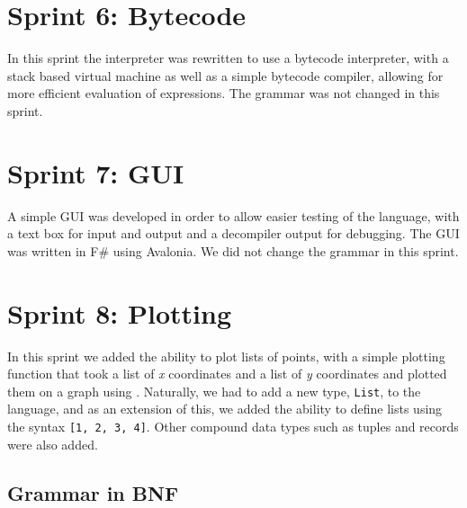 \section{Sprint 6: Bytecode}\label{sec:bytecode}

In this sprint the interpreter was rewritten to use a bytecode interpreter, with a stack based virtual machine as 
well as a simple bytecode compiler, allowing for more efficient evaluation of expressions.
The grammar was not changed in this sprint.

\section{Sprint 7: GUI}\label{sec:gui}

A simple GUI was developed in order to allow easier testing of the language, with a text box for input and output and a 
decompiler output for debugging.
The GUI was written in F\# using Avalonia\citep{avalonia}.
We did not change the grammar in this sprint.

\section{Sprint 8: Plotting}\label{sec:plotting1}

In this sprint we added the ability to plot lists of points, with a simple plotting function that took a list of
\textit{x} coordinates and a list of \textit{y} coordinates and plotted them on a graph using \citet{scottPlot}.
Naturally, we had to add a new type, \texttt{List}, to the language, and as an extension of this, we added the ability to
define lists using the syntax \texttt{[1, 2, 3, 4]}.
Other compound data types such as tuples and records were also added.

\subsection{Grammar in BNF}\label{subsec:grammar-in-bnf8}

